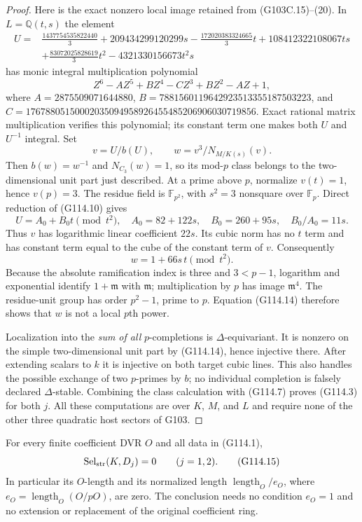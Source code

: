 \begin{proof}
Here is the exact nonzero local image retained from (G103C.15)--(20).
In $L=\mathbb Q(t,s)$ the element
\[
\begin{split}
 U={}&\frac{1437754535822440}{3}+209434299120299s
 -\frac{172020383324665}{3}t+108412322108067ts\\
 &+\frac{83072025828619}{3}t^2-4321330156673t^2s
\end{split}
 \tag{G114.10}
\]
has monic integral multiplication polynomial
\[
 Z^6-AZ^5+BZ^4-CZ^3+BZ^2-AZ+1,
 \tag{G114.11}
\]
where $A=2875509071644880$,
$B=7881560119642923513355187503223$, and
$C=17678805150002035094958926455485206906030719856$.
Exact rational matrix multiplication verifies this polynomial;
its constant term one makes both $U$ and $U^{-1}$ integral.
Set
\[
             v=U/b(U),\qquad
             w=v^3/N_{M/K(s)}(v).
 \tag{G114.12}
\]
Then $b(w)=w^{-1}$ and $N_{C_3}(w)=1$, so its mod-$p$ class
belongs to the two-dimensional unit part just described.
At a prime above $p$, normalize $v(t)=1$, hence $v(p)=3$.
The residue field is $\mathbb F_{p^2}$, with $s^2=3$ nonsquare
over $\mathbb F_p$.  Direct reduction of (G114.10) gives
\[
 U=A_0+B_0t\pmod{t^2},\quad
 A_0=82+122s,\quad B_0=260+95s,\quad B_0/A_0=11s.
 \tag{G114.13}
\]
Thus $v$ has logarithmic linear coefficient $22s$.
Its cubic norm has no $t$ term and has constant term equal to
the cube of the constant term of $v$.  Consequently
\[
                         w=1+66s\,t\pmod{t^2}.
 \tag{G114.14}
\]
Because the absolute ramification index is three and $3<p-1$,
logarithm and exponential identify $1+\mathfrak m$ with
$\mathfrak m$; multiplication by $p$ has image
$\mathfrak m^4$.  The residue-unit group has order $p^2-1$,
prime to $p$.  Equation (G114.14) therefore shows that $w$ is
not a local $p$th power.

Localization into the \emph{sum of all} $p$-completions is
$\Delta$-equivariant.  It is nonzero on the simple
two-dimensional unit part by (G114.14), hence injective there.
After extending scalars to $k$ it is injective on both target
cubic lines.  This also handles the possible exchange of two
$p$-primes by $b$; no individual completion is falsely declared
$\Delta$-stable.  Combining the class calculation with (G114.7)
proves (G114.3) for both $j$.
All these computations are over $K$, $M$, and $L$ and require
none of the other three quadratic host sectors of G103.
\end{proof}

\begin{theorem}
\label{thm:ACG114strict}
For every finite coefficient DVR $O$ and all data in (G114.1),
\[
                    \operatorname{Sel}_{\rm str}(K,D_j)=0
                       \qquad(j=1,2).
 \tag{G114.15}
\]
In particular its $O$-length and its normalized length
$\operatorname{length}_O/e_O$, where
$e_O=\operatorname{length}_O(O/pO)$, are zero.
The conclusion needs no condition $e_O=1$ and no extension or
replacement of the original coefficient ring.
\end{theorem}

